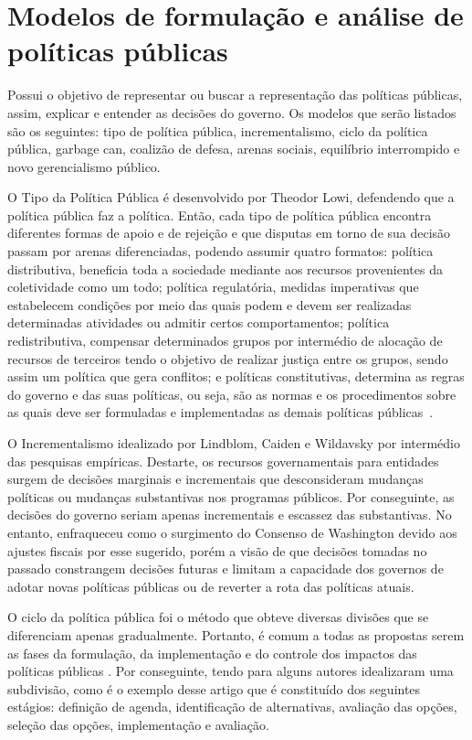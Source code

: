 \section{Modelos de formulação e análise de políticas públicas}


Possui o objetivo de representar ou buscar a representação das políticas públicas, assim, explicar e entender as decisões do governo. 
Os modelos que serão listados são os seguintes: tipo de política pública, incrementalismo, ciclo da política pública, garbage can, coalizão de defesa, arenas sociais, equilíbrio interrompido e novo gerencialismo público.

O Tipo da Política Pública é desenvolvido por Theodor Lowi, defendendo que a política pública faz a política.
Então, cada tipo de política pública encontra diferentes formas de apoio e de rejeição e que disputas em torno de sua decisão passam por arenas diferenciadas, podendo assumir quatro formatos: política distributiva, beneficia toda a sociedade mediante aos recursos provenientes da coletividade como um todo; política regulatória, medidas imperativas que estabelecem condições por meio das quais podem e devem ser realizadas determinadas atividades ou admitir certos comportamentos; política redistributiva, compensar determinados grupos por intermédio de alocação de recursos de terceiros tendo o objetivo de realizar justiça entre os grupos, sendo assim um política que gera conflitos; e políticas constitutivas, determina as regras do governo e das suas políticas, ou seja, são as normas e os procedimentos sobre as quais deve ser formuladas e implementadas as demais políticas públicas~\cite{rua2013}.

O Incrementalismo idealizado por Lindblom, Caiden e Wildavsky por intermédio das pesquisas empíricas. 
Destarte, os recursos governamentais para entidades surgem de decisões marginais e incrementais que desconsideram mudanças políticas ou mudanças substantivas nos programas públicos. 
Por conseguinte, as decisões do governo seriam apenas incrementais e escassez das substantivas.
No entanto, enfraqueceu como o surgimento  do Consenso de Washington devido aos ajustes fiscais por esse sugerido, porém a visão de que decisões tomadas no passado constrangem decisões futuras e limitam a capacidade dos governos de adotar novas políticas públicas ou de reverter a rota das políticas atuais.

O ciclo da política pública foi o método que obteve diversas divisões que se diferenciam apenas gradualmente. 
Portanto, é comum a todas as propostas serem as fases da formulação, da implementação e do controle dos impactos das políticas públicas \cite{rua2013}.
Por conseguinte, tendo para alguns autores idealizaram uma subdivisão, como é o exemplo desse artigo que é constituído dos seguintes estágios: definição de agenda, identificação de alternativas, avaliação das opções, seleção das opções, implementação e avaliação.


